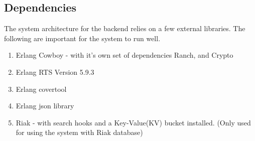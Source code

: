 \subsection {Dependencies}

The system architecture for the backend relies on a few external libraries. The following are important for the system to run well. 

\begin {enumerate}
\item Erlang Cowboy - with it's own set of dependencies Ranch, and Crypto
\item Erlang RTS Version 5.9.3
\item Erlang covertool
\item Erlang json library
\item Riak - with search hooks and a Key-Value(KV) bucket installed.
		(Only used for using the system with Riak database)
\end {enumerate}
